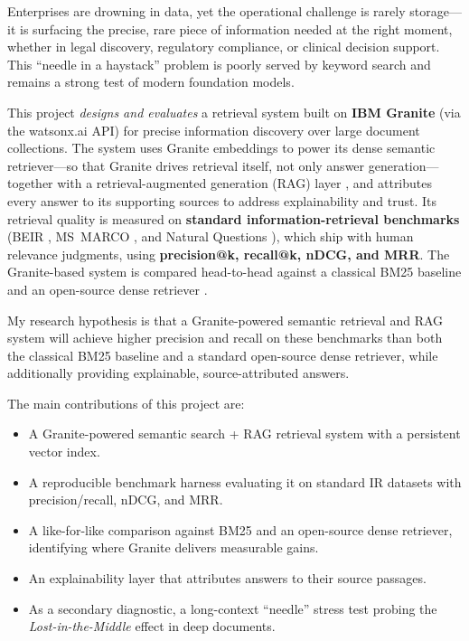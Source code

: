 Enterprises are drowning in data, yet the operational challenge is rarely
storage---it is surfacing the precise, rare piece of information needed at the
right moment, whether in legal discovery, regulatory compliance, or clinical
decision support. This ``needle in a haystack'' problem is poorly served by
keyword search and remains a strong test of modern foundation models.

This project \emph{designs and evaluates} a retrieval system built on
\textbf{IBM Granite} (via the watsonx.ai API) for precise information discovery
over large document collections. The system uses Granite embeddings to power its
dense semantic retriever---so that Granite drives retrieval itself, not only
answer generation---together with a retrieval-augmented generation (RAG) layer
\parencite{lewis2020rag}, and attributes every answer to its supporting sources
to address explainability and trust. Its retrieval quality is measured on \textbf{standard information-retrieval
benchmarks} (BEIR \parencite{thakur2021beir}, MS~MARCO \parencite{nguyen2016msmarco},
and Natural Questions \parencite{kwiatkowski2019nq}), which ship with human
relevance judgments, using \textbf{precision@k, recall@k, nDCG, and MRR}. The
Granite-based system is compared head-to-head against a classical BM25 baseline
\parencite{robertson2009bm25} and an open-source dense retriever
\parencite{karpukhin2020dpr}.

My research hypothesis is that a Granite-powered semantic retrieval and RAG
system will achieve higher precision and recall on these benchmarks than both
the classical BM25 baseline and a standard open-source dense retriever, while
additionally providing explainable, source-attributed answers.

The main contributions of this project are:

\begin{itemize}
  \item A Granite-powered semantic search + RAG retrieval system with a
        persistent vector index.
  \item A reproducible benchmark harness evaluating it on standard IR datasets
        with precision/recall, nDCG, and MRR.
  \item A like-for-like comparison against BM25 and an open-source dense
        retriever, identifying where Granite delivers measurable gains.
  \item An explainability layer that attributes answers to their source passages.
  \item As a secondary diagnostic, a long-context ``needle'' stress test probing
        the \emph{Lost-in-the-Middle} effect \parencite{liu2024lost} in deep
        documents.
\end{itemize}
